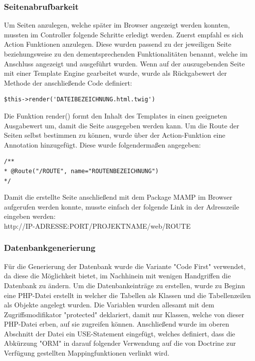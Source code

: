     \subsubsection{Seitenabrufbarkeit}

Um Seiten anzulegen, welche später im Browser angezeigt werden konnten, mussten im Controller folgende Schritte erledigt werden. Zuerst empfahl es sich Action Funktionen anzulegen. Diese wurden passend zu der jeweiligen Seite beziehungsweise zu den dementsprechenden Funktionalitäten benannt, welche im Anschluss angezeigt und ausgeführt wurden. Wenn auf der auszugebenden Seite mit einer Template Engine gearbeitet wurde, wurde als Rückgabewert der Methode der anschließende Code definiert:

	\lstset{language=php}
  	\begin{lstlisting}
$this->render('DATEIBEZEICHNUNG.html.twig')
  	\end{lstlisting}
Die Funktion render() formt den Inhalt des Templates in einen geeigneten Ausgabewert um, damit die Seite ausgegeben werden kann.
Um die Route der Seiten selbst bestimmen zu können, wurde über der Action-Funktion eine Annotation hinzugefügt. Diese wurde folgendermaßen angegeben:
	\lstset{language=php}
  	\begin{lstlisting}
/**
* @Route("/ROUTE", name="ROUTENBEZEICHNUNG")
*/
  	\end{lstlisting}
Damit die erstellte Seite anschließend mit dem Package MAMP im Browser aufgerufen werden konnte, musste einfach der folgende Link in der Adresszeile eingeben werden:\\
http://IP-ADRESSE:PORT/PROJEKTNAME/web/ROUTE

    \subsubsection{Datenbankgenerierung}

Für die Generierung der Datenbank wurde die Variante "Code First" verwendet, da diese die Möglichkeit bietet, im Nachhinein mit wenigen Handgriffen die Datenbank zu ändern.
Um die Datenbankeinträge zu erstellen, wurde zu Beginn eine PHP-Datei erstellt in welcher die Tabellen als Klassen und die Tabellenzeilen als Objekte angelegt wurden. Die Variablen wurden allesamt mit dem Zugriffsmodifikator "protected" deklariert, damit nur Klassen, welche von dieser PHP-Datei erben, auf sie zugreifen können. Anschließend wurde im oberen Abschnitt der Datei ein USE-Statement eingefügt, welches definiert, dass die Abkürzung "ORM" in darauf folgender Verwendung auf die von Doctrine zur Verfügung gestellten Mappingfunktionen verlinkt wird.

